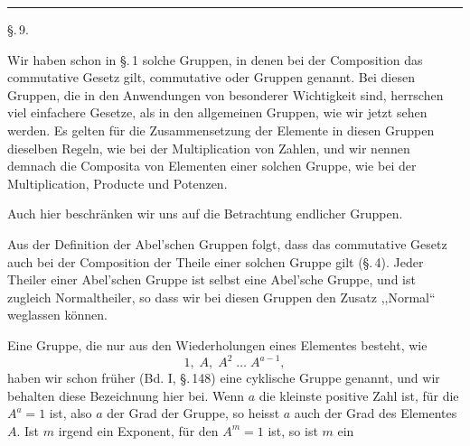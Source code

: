 \begin{center}


\rule{0.3\linewidth}{0.4pt}

\S.\,9.

\end{center}

Wir haben schon in \S.\,1 solche Gruppen, in denen bei der Composition das commutative Gesetz gilt, commutative oder  Gruppen genannt. Bei diesen Gruppen, die in den Anwendungen von besonderer Wichtigkeit sind, herrschen viel einfachere Gesetze, als in den allgemeinen Gruppen, wie wir jetzt sehen werden. Es gelten für die Zusammensetzung der Elemente in diesen Gruppen dieselben Regeln, wie bei der Multiplication von Zahlen, und wir nennen demnach die Composita von Elementen einer solchen Gruppe, wie bei der Multiplication, Producte und Potenzen.

Auch hier beschränken wir uns auf die Betrachtung endlicher Gruppen.

Aus der Definition der Abel'schen Gruppen folgt, dass das commutative Gesetz auch bei der Composition der Theile einer solchen Gruppe gilt (\S.\,4). Jeder Theiler einer Abel'schen Gruppe ist selbst eine Abel'sche Gruppe, und ist zugleich Normaltheiler, so dass wir bei diesen Gruppen den Zusatz ,,Normal`` weglassen können.

Eine Gruppe, die nur aus den Wiederholungen eines Elementes besteht, wie
\[ 1, \; A, \; A^2 \; \ldots \; A^{a-1}, \]
haben wir schon früher (Bd. I, \S.\,148) eine cyklische Gruppe genannt, und wir behalten diese Bezeichnung hier bei. Wenn $a$ die kleinste positive Zahl ist, für die $A^a = 1$ ist, also $a$ der Grad der Gruppe, so heisst $a$ auch der Grad des Elementes $A$. Ist $m$ irgend ein Exponent, für den $A^m = 1$ ist, so ist $m$ ein
